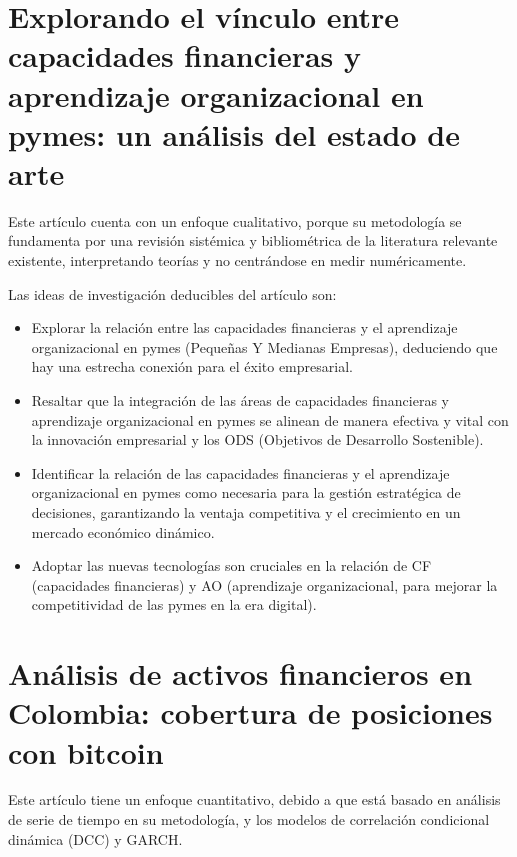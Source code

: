 \documentclass[letterpaper, 12pt]{report}
\begin{document}
\section*{Explorando el vínculo entre capacidades financieras y aprendizaje organizacional en pymes: un análisis del estado de arte}

Este artículo cuenta con un enfoque cualitativo, porque su metodología se
fundamenta por una revisión sistémica y bibliométrica de la literatura
relevante existente, interpretando teorías y no centrándose en medir
numéricamente.

Las ideas de investigación deducibles del artículo son:

\begin{itemize}
      \item Explorar la relación entre las capacidades financieras y el aprendizaje
            organizacional en pymes (Pequeñas Y Medianas Empresas), deduciendo que hay una
            estrecha conexión para el éxito empresarial.

      \item Resaltar que la integración de las áreas de capacidades financieras y
            aprendizaje organizacional en pymes se alinean de manera efectiva y vital con
            la innovación empresarial y los ODS (Objetivos de Desarrollo Sostenible).

      \item Identificar la relación de las capacidades financieras y el aprendizaje
            organizacional en pymes como necesaria para la gestión estratégica de
            decisiones, garantizando la ventaja competitiva y el crecimiento en un mercado
            económico dinámico.

      \item Adoptar las nuevas tecnologías son cruciales en la relación de CF (capacidades
            financieras) y AO (aprendizaje organizacional, para mejorar la competitividad
            de las pymes en la era digital).
\end{itemize}

\section*{Análisis de activos financieros en Colombia: cobertura de posiciones con bitcoin}

Este artículo tiene un enfoque cuantitativo, debido a que está basado en
análisis de serie de tiempo en su metodología, y los modelos de correlación
condicional dinámica (DCC) y GARCH\@{}.
\end{document}
